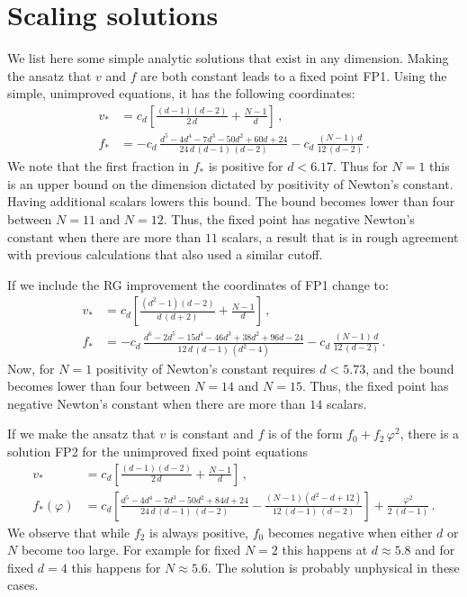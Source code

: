 \documentclass[11pt]{book} %
\begin{document}
\section{Scaling solutions}

We list here some simple analytic solutions
that exist in any dimension.
Making the ansatz that $v$ and $f$ are both constant leads
to a fixed point FP1.
Using the simple, unimproved equations, it has the following coordinates:
\begin{align}
  v_* &=   c_d \left[ \frac{ (d-1)(d-2) }{ 2 \, d } + \frac{N-1}{d} \right] \,, \\
  f_* &= - c_d \, \frac{d^5-4d^4-7d^3-50d^2+60d+24}{24 \, d \, (d-1) \, (d-2)}
         - c_d \, \frac{(N-1) \, d}{12 \, (d-2)} \,.
\end{align}
We note that the first fraction in $f_*$ is positive for $d<6.17$.
Thus for $N=1$ this is an upper bound on the dimension
dictated by positivity of Newton's constant.
Having additional scalars lowers this bound.
The bound becomes lower than four between $N=11$ and $N=12$.
Thus, the fixed point has negative Newton's constant
when there are more than $11$ scalars, a result that is in
rough agreement with previous calculations \cite{Dona:2013qba}
that also used a similar cutoff.

If we include the RG improvement the coordinates of FP1 change to:
\begin{align}
  v_* &=  c_d \left[ \frac{(d^2-1)(d-2)}{d \, (d+2)} + \frac{N-1}{d} \right] \,, \\
  f_* &= -c_d \, \frac{d^6-2d^5-15d^4-46d^3+38d^2+96d-24}{12 \, d \, (d-1) \, (d^2-4)}
         -c_d \, \frac{(N-1) \, d}{12 \, (d-2)} \,.
\end{align}
Now, for $N=1$ positivity of Newton's constant requires $d<5.73$,
and the bound becomes lower than four between $N=14$ and $N=15$.
Thus, the fixed point has negative Newton's constant
when there are more than $14$ scalars.

If we make the ansatz that $v$ is constant and $f$ is of the
form $f_0 + f_2 \, \varphi^2$, there is a solution FP2
for the unimproved fixed point equations
\begin{align}
  v_*          &= c_d \left[\frac{(d-1) (d-2)}{2 \, d}+\frac{N-1}{d}\right] \,, \\
  f_*(\varphi) &= c_d \left[ \frac{d^5-4 d^4-7 d^3-50 d^2+84 d+24}{24 \, d \, (d-1) \, (d-2)}
                  - \frac{(N-1)(d^2-d+12)}{12 \, (d-1) \, (d-2)}\right]
                  + \frac{\varphi^2}{2 \, (d-1)}\,.
\end{align}
We observe that while $f_2$ is always positive,
$f_0$ becomes negative when either $d$ or $N$ become
too large. For example for fixed $N=2$ this happens at $d\approx 5.8$
and for fixed $d=4$ this happens for $N\approx 5.6$.
The solution is probably unphysical in these cases.
\end{document}

